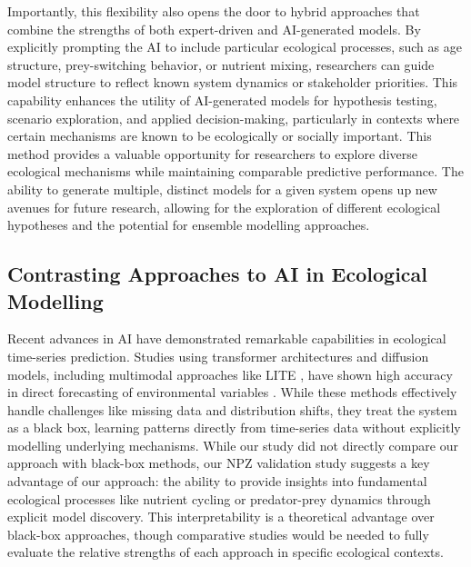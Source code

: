 Importantly, this flexibility also opens the door to hybrid approaches that combine the strengths of both expert-driven and AI-generated models. By explicitly prompting the AI to include particular ecological processes, such as age structure, prey-switching behavior, or nutrient mixing, researchers can guide model structure to reflect known system dynamics or stakeholder priorities. This capability enhances the utility of AI-generated models for hypothesis testing, scenario exploration, and applied decision-making, particularly in contexts where certain mechanisms are known to be ecologically or socially important. This method provides a valuable opportunity for researchers to explore diverse ecological mechanisms while maintaining comparable predictive performance. The ability to generate multiple, distinct models for a given system opens up new avenues for future research, allowing for the exploration of different ecological hypotheses and the potential for ensemble modelling approaches.


\subsection{Contrasting Approaches to AI in Ecological Modelling}
Recent advances in AI have demonstrated remarkable capabilities in ecological time-series prediction. Studies using transformer architectures and diffusion models, including multimodal approaches like LITE \citep{li2024lite}, have shown high accuracy in direct forecasting of environmental variables \citep{morales2024developing,gandhi2024generative}. While these methods effectively handle challenges like missing data and distribution shifts, they treat the system as a black box, learning patterns directly from time-series data without explicitly modelling underlying mechanisms. While our study did not directly compare our approach with black-box methods, our NPZ validation study suggests a key advantage of our approach: the ability to provide insights into fundamental ecological processes like nutrient cycling or predator-prey dynamics through explicit model discovery. This interpretability is a theoretical advantage over black-box approaches, though comparative studies would be needed to fully evaluate the relative strengths of each approach in specific ecological contexts.

